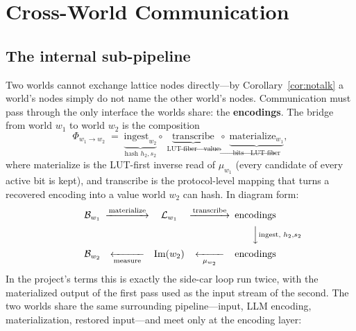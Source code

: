 \documentclass[11pt,a4paper]{article}
\theoremstyle{remark}
\newcommand{\Lat}{\ensuremath{\mathcal{B}}}         %
\newcommand{\Img}{\ensuremath{\mathrm{Im}}}         %
\newcommand{\Lut}{\ensuremath{\mathcal{L}}}         %
\newcommand{\Bnd}{\ensuremath{\Phi}}                %
\begin{document}
\section{Cross-World Communication}
\label{sec:bridge}

\subsection{The internal sub-pipeline}

Two worlds cannot exchange lattice nodes directly---by
Corollary~\ref{cor:notalk} a world's nodes simply do not name the other world's
nodes. Communication must pass through the only interface the worlds share:
the \textbf{encodings}. The bridge from world $w_1$ to world $w_2$ is the
composition
\begin{equation}
  \label{eq:bridge}
  \Bnd_{w_1\to w_2}
  \;=\;
  \underbrace{\text{ingest}_{w_2}}_{\text{hash }h_2,s_2}
  \circ\;
  \underbrace{\text{transcribe}}_{\text{LUT fiber} \to \text{value}}
  \circ\;
  \underbrace{\text{materialize}_{w_1}}_{\text{bits} \to \text{LUT fiber}},
\end{equation}
where materialize is the LUT-first inverse read of $\mu_{w_1}$ (every candidate
of every active bit is kept), and transcribe is the protocol-level mapping that
turns a recovered encoding into a value world $w_2$ can hash. In diagram form:
\begin{equation}
  \begin{CD}
    \Lat_{w_1} @>{\text{materialize}}>> \Lut_{w_1}
    @>{\text{transcribe}}>> \text{encodings}\\
    @. @. @VV{\text{ingest, }h_2,s_2}V\\
    \Lat_{w_2} @<<{\text{measure}}< \Img(w_2) @<<{\mu_{w_2}}< \text{encodings}
  \end{CD}
\end{equation}
In the project's terms this is exactly the side-car loop run twice, with the
materialized output of the first pass used as the input stream of the second.
The two worlds share the same surrounding pipeline---input, LLM encoding,
materialization, restored input---and meet only at the encoding layer:
\end{document}
